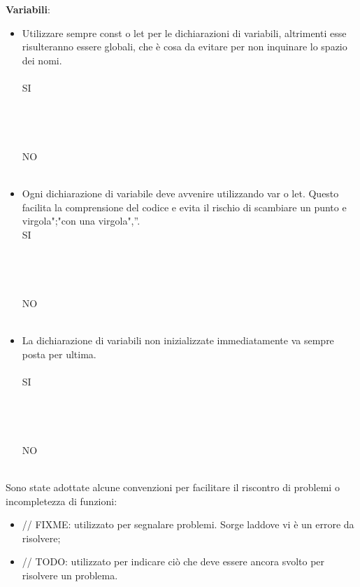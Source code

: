     \textbf{Variabili}:
\begin{itemize}
    \item Utilizzare sempre const o let per le dichiarazioni di variabili, altrimenti esse risulteranno essere globali, che è cosa da evitare per non inquinare lo spazio dei nomi.\\ \\
    SI\\ \\ \\ \\ \\
    NO\\ \\ 
    \item Ogni dichiarazione di variabile deve avvenire utilizzando var o let. Questo facilita la comprensione del codice e evita il rischio di scambiare un punto e virgola";"con una virgola",”.\\
    SI\\ \\ \\ \\ \\
    NO\\ \\ 
    \item La dichiarazione di variabili non inizializzate immediatamente va sempre posta per ultima.\\ \\
    SI\\ \\ \\ \\ \\
    NO\\ \\ 
\end{itemize}

Sono state adottate alcune convenzioni per facilitare il riscontro di problemi o incompletezza di funzioni:
\begin{itemize}
    \item // FIXME: utilizzato per segnalare problemi. Sorge laddove vi è un errore da risolvere;
    \item // TODO: utilizzato per indicare ciò che deve essere ancora svolto per risolvere un problema.
\end{itemize}